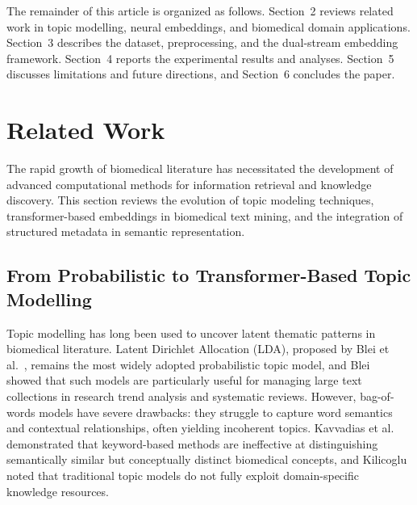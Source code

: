 \documentclass[authorproof,JACIII,researchpaper]{fujipressarticle}
\begin{document}
{\color{red}%
The remainder of this article is organized as follows. Section~2 reviews related work in topic modelling, neural embeddings, and biomedical domain applications. Section~3 describes the dataset, preprocessing, and the dual-stream embedding framework. Section~4 reports the experimental results and analyses. Section~5 discusses limitations and future directions, and Section~6 concludes the paper.
}%

\section{Related Work}

The rapid growth of biomedical literature has necessitated the development of advanced computational methods for information retrieval and knowledge discovery. This section reviews the evolution of topic modeling techniques, transformer-based embeddings in biomedical text mining, and the integration of structured metadata in semantic representation.

{\color{red}%
\subsection{From Probabilistic to Transformer-Based Topic Modelling}
}%

{\color{red}%
Topic modelling has long been used to uncover latent thematic patterns in biomedical literature. Latent Dirichlet Allocation (LDA), proposed by Blei et al.~\cite{blei_latent_2003}, remains the most widely adopted probabilistic topic model, and Blei~\cite{blei_probabilistic_2012} showed that such models are particularly useful for managing large text collections in research trend analysis and systematic reviews. However, bag-of-words models have severe drawbacks: they struggle to capture word semantics and contextual relationships, often yielding incoherent topics. Kavvadias et al.~\cite{kavvadias_supporting_2020} demonstrated that keyword-based methods are ineffective at distinguishing semantically similar but conceptually distinct biomedical concepts, and Kilicoglu~\cite{kilicoglu_biomedical_2018} noted that traditional topic models do not fully exploit domain-specific knowledge resources.
}%
\end{document}
